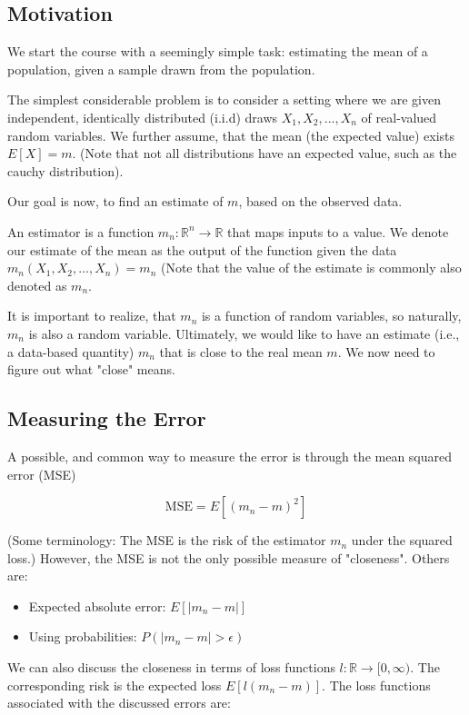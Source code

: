 \documentclass[12pt, authoryear]{elsarticle}
\begin{document}
\subsection{Motivation}

We start the course with a seemingly simple task: estimating the mean of a population, given a sample drawn from the population.

The simplest considerable problem is to consider a setting where we are given independent, identically distributed (i.i.d) draws $X_1, X_2, ... , X_n$ of real-valued random variables. We further assume, that the mean (the expected value) exists $E[X] = m$. (Note that not all distributions have an expected value, such as the cauchy distribution).

Our goal is now, to find an estimate of $m$, based on the observed data. 

An estimator is a function $m_n : \mathbb{R}^n \rightarrow \mathbb{R}$ that maps inputs to a value. We denote our estimate of the mean as the output of the function given the data $m_n(X_1, X_2, ..., X_n) = m_n$ (Note that the value of the estimate is commonly also denoted as $m_n$. 

It is important to realize, that $m_n$ is a function of random variables, so naturally, $m_n$ is also a random variable. Ultimately, we would like to have an estimate (i.e., a data-based quantity) $m_n$ that is close to the real mean $m$. We now need to figure out what "close" means.

\subsection{Measuring the Error}

A possible, and common way to measure the error is through the mean squared error (MSE)

$$ \text{MSE} = E[(m_n - m ) ^2]$$

(Some terminology: The MSE is the risk of the estimator $m_n$ under the squared loss.) However, the MSE is not the only possible measure of "closeness". Others are:

\begin{itemize}
\item Expected absolute error: $E[|m_n -m|]$
\item Using probabilities: $P(|m_n - m| > \epsilon) $
\end{itemize}

We can also discuss the closeness in terms of loss functions $l: \mathbb{R} \rightarrow [0, \infty)$. The corresponding risk is the expected loss $E[l(m_n -m)]$.
The loss functions associated with the discussed errors are:
\end{document}
